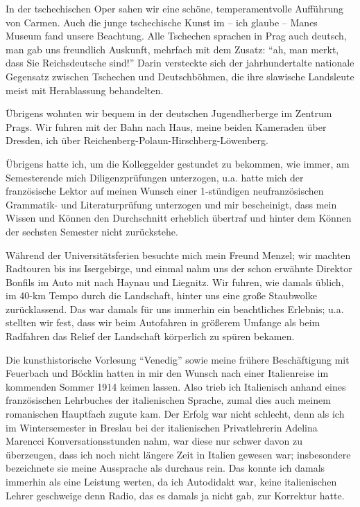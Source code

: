 In der tschechischen Oper sahen wir eine schöne, temperamentvolle Aufführung von Carmen. Auch die junge tschechische Kunst im -- ich glaube -- Manes Museum fand unsere Beachtung. Alle Tschechen sprachen in Prag auch deutsch, man gab uns freundlich Auskunft, mehrfach mit dem Zusatz: \enquote{ah, man merkt, dass Sie Reichsdeutsche sind!} Darin versteckte sich der jahrhundertalte nationale Gegensatz zwischen Tschechen und Deutschböhmen, die ihre slawische Landsleute meist mit Herablassung behandelten.

Übrigens wohnten wir bequem in der deutschen Jugendherberge im Zentrum Prags. Wir fuhren mit der Bahn nach Haus, meine beiden Kameraden über Dresden, ich über Reichenberg-Polaun-Hirschberg-Löwenberg.

Übrigens hatte ich, um die Kolleggelder gestundet zu bekommen, wie immer, am Semesterende mich Diligenzprüfungen unterzogen, u.a. hatte mich der französische Lektor auf meinen Wunsch einer 1-stündigen neufranzösischen Grammatik- und Literaturprüfung unterzogen und mir bescheinigt, dass mein Wissen und Können den Durchschnitt erheblich übertraf und hinter dem Können der sechsten Semester nicht zurückstehe.

Während der Universitätsferien besuchte mich mein Freund Menzel; wir machten Radtouren bis ins Isergebirge, und einmal nahm uns der schon erwähnte Direktor Bonfils im Auto mit nach Haynau und Liegnitz. Wir fuhren, wie damals üblich, im 40-km Tempo durch die Landschaft, hinter uns eine große Staubwolke zurücklassend. Das war damals für uns immerhin ein beachtliches Erlebnis; u.a. stellten wir fest, dass wir beim Autofahren in größerem Umfange als beim Radfahren das Relief der Landschaft körperlich zu spüren bekamen.

Die kunsthistorische Vorlesung \enquote{Venedig} sowie meine frühere Beschäftigung mit Feuerbach und Böcklin hatten in mir den Wunsch nach einer Italienreise im kommenden Sommer 1914 keimen lassen. Also trieb ich Italienisch anhand eines französischen Lehrbuches der italienischen Sprache, zumal dies auch meinem romanischen Hauptfach zugute kam. Der Erfolg war nicht schlecht, denn als ich im Wintersemester in Breslau bei der italienischen Privatlehrerin Adelina Marencci Konversationsstunden nahm, war diese nur schwer davon zu überzeugen, dass ich noch nicht längere Zeit in Italien gewesen war; insbesondere bezeichnete sie meine Aussprache als durchaus rein. Das konnte ich damals immerhin als eine Leistung werten, da ich Autodidakt war, keine italienischen Lehrer geschweige denn Radio, das es damals ja nicht gab, zur Korrektur hatte.\\

